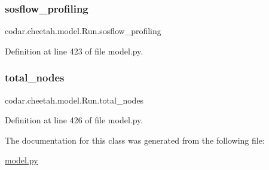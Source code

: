 \subsubsection{\texorpdfstring{sosflow\+\_\+profiling}{sosflow\_profiling}}
{\footnotesize\ttfamily codar.\+cheetah.\+model.\+Run.\+sosflow\+\_\+profiling}



Definition at line 423 of file model.\+py.

\mbox{\label{classcodar_1_1cheetah_1_1model_1_1_run_a441a213a4a37f8cde9db77ecb9a72e89}} 
\subsubsection{\texorpdfstring{total\+\_\+nodes}{total\_nodes}}
{\footnotesize\ttfamily codar.\+cheetah.\+model.\+Run.\+total\+\_\+nodes}



Definition at line 426 of file model.\+py.



The documentation for this class was generated from the following file\+:\begin{DoxyCompactItemize}
\item 
\hyperlink{model_8py}{model.\+py}\end{DoxyCompactItemize}
